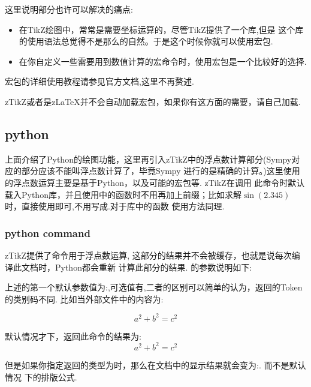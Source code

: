 这里说明部分也许可以解决的痛点: 
\begin{itemize}
    \item 在TikZ绘图中，常常是需要坐标运算的，尽管TikZ提供了一个库,但是
        这个库的使用语法总觉得不是那么的自然。于是这个时候你就可以使用宏包.
    \item 在你自定义一些需要用到数值计算的宏命令时，使用宏包是一个比较好的选择.
\end{itemize}

宏包的详细使用教程请参见官方文档,这里不再赘述.

\begin{leftbar}
\noindent zTikZ或者是z\LaTeX{}并不会自动加载宏包，如果你有这方面的需要，请自己加载.
\end{leftbar}


\subsection{python}
上面介绍了Python的绘图功能，这里再引入zTikZ中的浮点数计算部分(Sympy对应的部分应该不能叫浮点数计算了，毕竟Sympy
进行的是精确的计算。)这里使用的浮点数运算主要是基于Python，以及可能的宏包等. zTikZ在调用
此命令时默认载入Python库，并且使用中的函数时不用再加上前缀；比如求解$\sin(2.345)$
时，直接使用即可,不用写成.对于库中的函数
使用方法同理.

\subsubsection{python command}
zTikZ提供了命令\cmd{\py}\index{\cmd{\py}}用于浮点数运算, 这部分的结果并不会被缓存，也就是说每次编译此文档时，Python都会重新
计算此部分的结果. \cmd{\py}的参数说明如下:

\begin{codeprint}
\end{codeprint}

上述的第一个默认参数值为:,可选值有,二者的区别可以简单的认为，返回的Token的类别码不同.
比如当外部文件中的内容为:
\begin{codeprint}
\[ a^2 + b^2 = c^2 \]
\end{codeprint}

默认情况才下，\cmd{\py}返回此命令的结果为:
\[
    a^2 + b^2 = c^2    
\]

但是如果你指定返回的类型为时，那么在文档中的显示结果就会变为:\cmd{\[ a^2 + b^2 = c^2 \]}. 而不是默认情况
下的排版公式.

